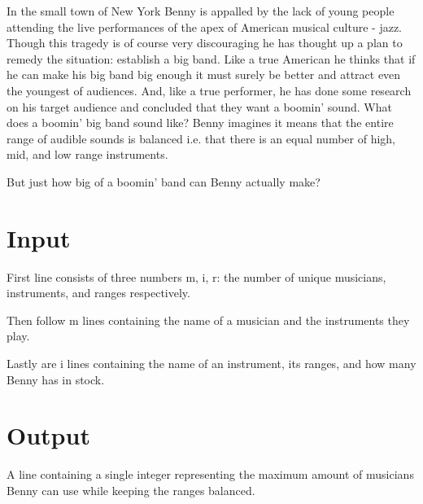 
In the small town of New York Benny is appalled by the lack of young people attending the live performances of the apex of American musical culture - jazz. Though this tragedy is of course very discouraging he has thought up a plan to remedy the situation: establish a big band. Like a true American he thinks that if he can make his big band big enough it must surely be better and attract even the youngest of audiences. And, like a true performer, he has done some research on his target audience and concluded that they want a boomin' sound. What does a boomin' big band sound like? Benny imagines it means that the entire range of audible sounds is balanced i.e. that there is an equal number of high, mid, and low range instruments.

But just how big of a boomin' band can Benny actually make?

\section*{Input}

First line consists of three numbers m, i, r: the number of unique musicians, instruments, and ranges respectively.

Then follow m lines containing the name of a musician and the instruments they play.

Lastly are i lines containing the name of an instrument, its ranges, and how many Benny has in stock.

\section*{Output}

A line containing a single integer representing the maximum amount of musicians Benny can use while keeping the ranges balanced.
